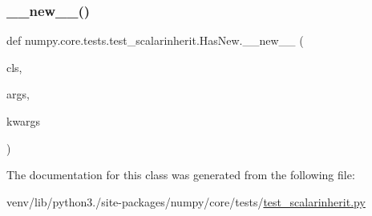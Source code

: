 \subsubsection{\texorpdfstring{\+\_\+\+\_\+new\+\_\+\+\_\+()}{\_\_new\_\_()}}
{\footnotesize\ttfamily def numpy.\+core.\+tests.\+test\+\_\+scalarinherit.\+Has\+New.\+\_\+\+\_\+new\+\_\+\+\_\+ (\begin{DoxyParamCaption}\item[{}]{cls,  }\item[{}]{args,  }\item[{}]{kwargs }\end{DoxyParamCaption})}



The documentation for this class was generated from the following file\+:\begin{DoxyCompactItemize}
\item 
venv/lib/python3./site-\/packages/numpy/core/tests/\hyperlink{test__scalarinherit_8py}{test\+\_\+scalarinherit.\+py}\end{DoxyCompactItemize}
